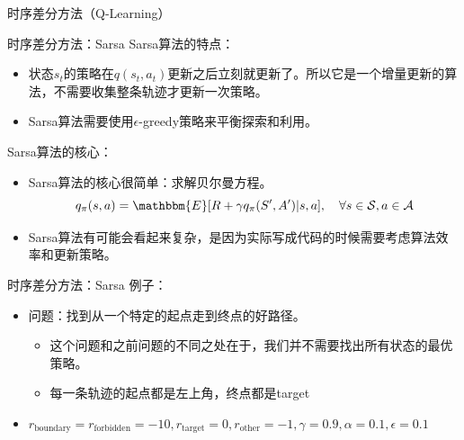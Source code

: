 \begin{section}{时序差分方法\alert{（Q-Learning）}}
\begin{frame}{时序差分方法：Sarsa}
    Sarsa算法的特点：
    \begin{itemize}
        \item 状态$s_t$的策略在$q(s_t,a_t)$更新之后立刻就更新了。所以它是一个增量更新的算法，不需要收集整条轨迹才更新一次策略。
        \item Sarsa算法需要使用$\epsilon$-greedy策略来平衡探索和利用。
    \end{itemize}
    Sarsa算法的核心：
    \begin{itemize}
        \item Sarsa算法的核心很简单：求解贝尔曼方程。
        \[
            q_\pi(s,a)=\mathbbm{E}[R+\gamma q_\pi(S',A')|s,a], \quad \forall s\in\mathcal{S}, a\in\mathcal{A}
        \]
        \item Sarsa算法有可能会看起来复杂，是因为实际写成代码的时候需要考虑算法效率和更新策略。
    \end{itemize}
\end{frame}

\begin{frame}{时序差分方法：Sarsa}
    例子：
    \begin{itemize}
        \item 问题：找到从一个\alert{特定的起点}走到终点的好路径。
        \begin{itemize}
            \item 这个问题和之前问题的不同之处在于，我们并不需要找出\alert{所有状态的最优策略}。
            \item 每一条轨迹的起点都是左上角，终点都是target
        \end{itemize}
        \item $r_{\text{boundary}}=r_{\text{forbidden}}=-10, r_{\text{target}}=0, r_\text{other}=-1, \gamma=0.9, \alpha=0.1, \epsilon=0.1$
    \end{itemize}
\end{frame}


\end{section}
